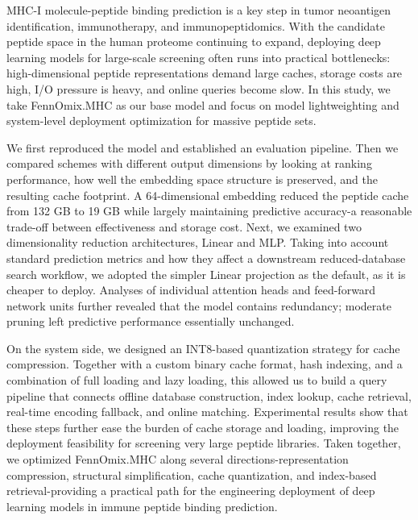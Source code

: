 MHC-I molecule-peptide binding prediction is a key step in tumor neoantigen identification, immunotherapy, and immunopeptidomics. With the candidate peptide space in the human proteome continuing to expand, deploying deep learning models for large-scale screening often runs into practical bottlenecks: high-dimensional peptide representations demand large caches, storage costs are high, I/O pressure is heavy, and online queries become slow. In this study, we take FennOmix.MHC as our base model and focus on model lightweighting and system-level deployment optimization for massive peptide sets.

We first reproduced the model and established an evaluation pipeline. Then we compared schemes with different output dimensions by looking at ranking performance, how well the embedding space structure is preserved, and the resulting cache footprint. A 64-dimensional embedding reduced the peptide cache from 132 GB to 19 GB while largely maintaining predictive accuracy-a reasonable trade-off between effectiveness and storage cost. Next, we examined two dimensionality reduction architectures, Linear and MLP. Taking into account standard prediction metrics and how they affect a downstream reduced-database search workflow, we adopted the simpler Linear projection as the default, as it is cheaper to deploy. Analyses of individual attention heads and feed-forward network units further revealed that the model contains redundancy; moderate pruning left predictive performance essentially unchanged.

On the system side, we designed an INT8-based quantization strategy for cache compression. Together with a custom binary cache format, hash indexing, and a combination of full loading and lazy loading, this allowed us to build a query pipeline that connects offline database construction, index lookup, cache retrieval, real-time encoding fallback, and online matching. Experimental results show that these steps further ease the burden of cache storage and loading, improving the deployment feasibility for screening very large peptide libraries. Taken together, we optimized FennOmix.MHC along several directions-representation compression, structural simplification, cache quantization, and index-based retrieval-providing a practical path for the engineering deployment of deep learning models in immune peptide binding prediction.